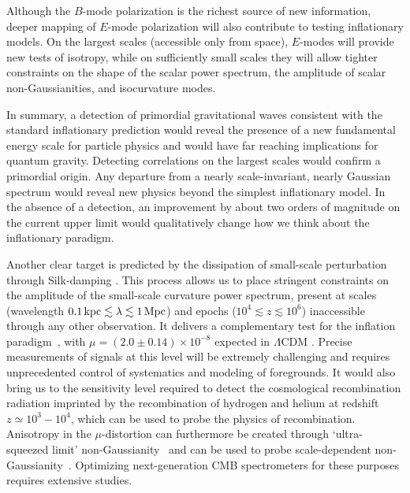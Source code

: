 Although the $B$-mode polarization is the richest source of new information, deeper mapping of $E$-mode polarization will also contribute to testing inflationary models. On the largest scales (accessible only from space), $E$-modes will provide new tests of isotropy, while on sufficiently small scales they will allow tighter constraints on the shape of the scalar power spectrum, the amplitude of scalar non-Gaussianities, and isocurvature modes.  

In summary, a detection of primordial gravitational waves consistent with the standard inflationary prediction would reveal the presence of a new fundamental energy scale for particle physics and would have far reaching implications for quantum gravity. Detecting correlations on the largest scales would confirm a primordial origin. Any departure from a nearly scale-invariant, nearly Gaussian spectrum would reveal new physics beyond the simplest inflationary model. In the absence of a detection, an improvement by about two orders of magnitude on the current upper limit would qualitatively change how we think about the inflationary paradigm.

 Another clear target is predicted by the dissipation of small-scale perturbation through Silk-damping \citep{Sunyaev1970diss, Daly1991, Hu1994, Chluba2012}. This process allows us to place stringent constraints on the amplitude of the small-scale curvature power spectrum, present at scales (wavelength $0.1 \,{\rm kpc} \lesssim \lambda \lesssim 1\, {\rm Mpc}$) and epochs ($10^4 \lesssim z\lesssim 10^6$) inaccessible through any other observation. It delivers a complementary test for the inflation paradigm~\citep{Chluba2012inflaton, Dent2012, Chluba2013PCA, Clesse2014, Cabass2016}, with $\mu=(2.0\pm0.14)\times 10^{-8}$ expected in $\Lambda$CDM \citep{Chluba2016LCDM}. Precise measurements of signals at this level will be extremely challenging and requires unprecedented control of systematics and modeling of foregrounds. It would also bring us to the sensitivity level required to detect the cosmological recombination radiation \citep{Sunyaev2009, Chluba2016} imprinted by the recombination of hydrogen and helium at redshift $z\simeq 10^3-10^4$, which can be used to probe the physics of recombination. Anisotropy in the $\mu$-distortion can furthermore be created through `ultra-squeezed limit' non-Gaussianity~\citep{Pajer2012, Ganc2012} and can be used to probe scale-dependent non-Gaussianity~\citep{Biagetti2013, Razi2015}. Optimizing next-generation CMB spectrometers for these purposes requires extensive studies.

